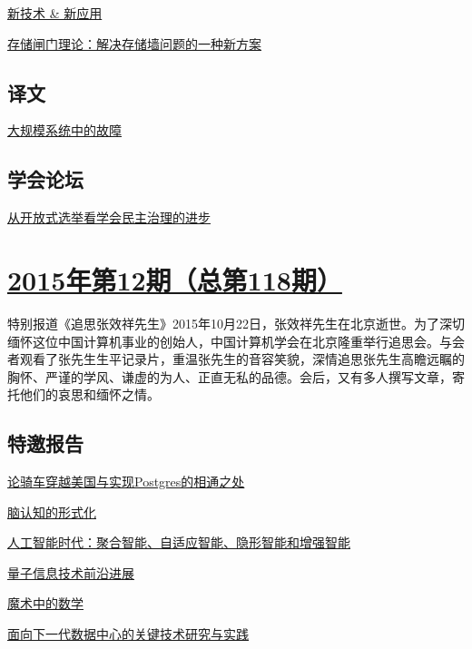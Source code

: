 \documentclass[a4paper]{article}
\begin{document}
\href{http://history.ccf.org.cn/resources/1190201776262/2016/01/13/18.pdf}{新技术 \& 新应用}

\href{http://history.ccf.org.cn/resources/1190201776262/2016/01/13/16.pdf}{存储闸门理论：解决存储墙问题的一种新方案}

\subsection{译文}
\href{http://history.ccf.org.cn/resources/1190201776262/2016/01/13/20.pdf}{大规模系统中的故障}

\subsection{学会论坛}
\href{http://history.ccf.org.cn/resources/1190201776262/2016/01/13/19.pdf}{从开放式选举看学会民主治理的进步}


\section{\href{http://history.ccf.org.cn/sites/ccf/jsjtbbd.jsp?contentId=2897719129971}{\textbf{2015年第12期（总第118期）}}}
特别报道《追思张效祥先生》2015年10月22日，张效祥先生在北京逝世。为了深切缅怀这位中国计算机事业的创始人，中国计算机学会在北京隆重举行追思会。与会者观看了张先生生平记录片，重温张先生的音容笑貌，深情追思张先生高瞻远瞩的胸怀、严谨的学风、谦虚的为人、正直无私的品德。会后，又有多人撰写文章，寄托他们的哀思和缅怀之情。
\subsection{特邀报告}
\href{http://history.ccf.org.cn/resources/1190201776262/2015/12/11/11.pdf}{论骑车穿越美国与实现Postgres的相通之处}

\href{http://history.ccf.org.cn/resources/1190201776262/2015/12/11/12.pdf}{脑认知的形式化}

\href{http://history.ccf.org.cn/resources/1190201776262/2015/12/11/16.pdf}{人工智能时代：聚合智能、自适应智能、隐形智能和增强智能}

\href{http://history.ccf.org.cn/resources/1190201776262/2015/12/11/13.pdf}{量子信息技术前沿进展}

\href{http://history.ccf.org.cn/resources/1190201776262/2015/12/11/15.pdf}{魔术中的数学}

\href{http://history.ccf.org.cn/resources/1190201776262/2015/12/11/18.pdf}{面向下一代数据中心的关键技术研究与实践}
\end{document}
